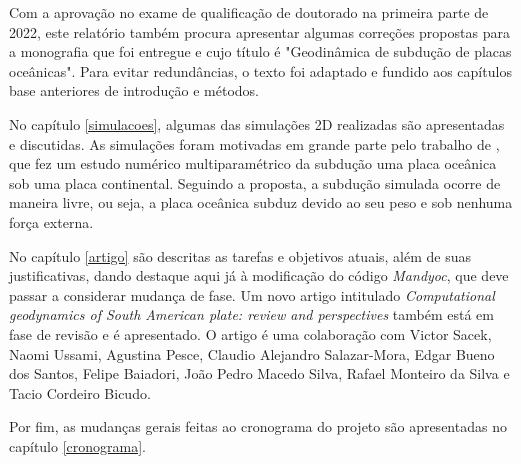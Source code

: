Com a aprovação no exame de qualificação de doutorado na primeira parte de 2022, este relatório também procura apresentar algumas correções propostas para a monografia que foi entregue e cujo título é "Geodinâmica de subdução de placas oceânicas". Para evitar redundâncias, o texto foi adaptado e fundido aos capítulos base anteriores de introdução e métodos.

No capítulo \ref{simulacoes}, algumas das simulações 2D realizadas são apresentadas e discutidas. As simulações foram motivadas em grande parte pelo trabalho de \cite{strak2021thermo}, que fez um estudo numérico multiparamétrico da subdução uma placa oceânica sob uma placa continental. Seguindo a proposta, a subdução simulada ocorre de maneira livre, ou seja, a placa oceânica subduz devido ao seu peso e sob nenhuma força externa.

No capítulo \ref{artigo} são descritas as tarefas e objetivos atuais, além de suas justificativas, dando destaque aqui já à modificação do código \textit{Mandyoc}, que deve passar a considerar mudança de fase. Um novo artigo intitulado \textit{Computational geodynamics of South American plate: review and perspectives} também está em fase de revisão e é apresentado. O artigo é uma colaboração com Victor Sacek, Naomi Ussami, Agustina Pesce, Claudio Alejandro Salazar-Mora, Edgar Bueno dos Santos, Felipe Baiadori, João Pedro Macedo Silva, Rafael Monteiro da Silva e Tacio Cordeiro Bicudo.

Por fim, as mudanças gerais feitas ao cronograma do projeto são apresentadas no capítulo \ref{cronograma}.

